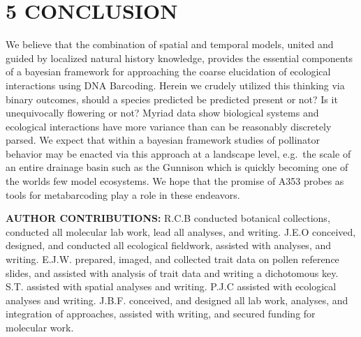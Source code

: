 \documentclass[
]{article}
\begin{document}
\hypertarget{conclusion}{%
\section{5 \textbar{} CONCLUSION}\label{conclusion}}

We believe that the combination of spatial and temporal models, united
and guided by localized natural history knowledge, provides the
essential components of a bayesian framework for approaching the coarse
elucidation of ecological interactions using DNA Barcoding. Herein we
crudely utilized this thinking via binary outcomes, should a species
predicted be predicted present or not? Is it unequivocally flowering or
not? Myriad data show biological systems and ecological interactions
have more variance than can be reasonably discretely parsed. We expect
that within a bayesian framework studies of pollinator behavior may be
enacted via this approach at a landscape level, e.g.~the scale of an
entire drainage basin such as the Gunnison which is quickly becoming one
of the worlds few model ecosystems. We hope that the promise of A353
probes as tools for metabarcoding play a role in these endeavors.

\textbf{AUTHOR CONTRIBUTIONS:} R.C.B conducted botanical collections,
conducted all molecular lab work, lead all analyses, and writing. J.E.O
conceived, designed, and conducted all ecological fieldwork, assisted
with analyses, and writing. E.J.W. prepared, imaged, and collected trait
data on pollen reference slides, and assisted with analysis of trait
data and writing a dichotomous key. S.T. assisted with spatial analyses
and writing. P.J.C assisted with ecological analyses and writing. J.B.F.
conceived, and designed all lab work, analyses, and integration of
approaches, assisted with writing, and secured funding for molecular
work.
\end{document}
